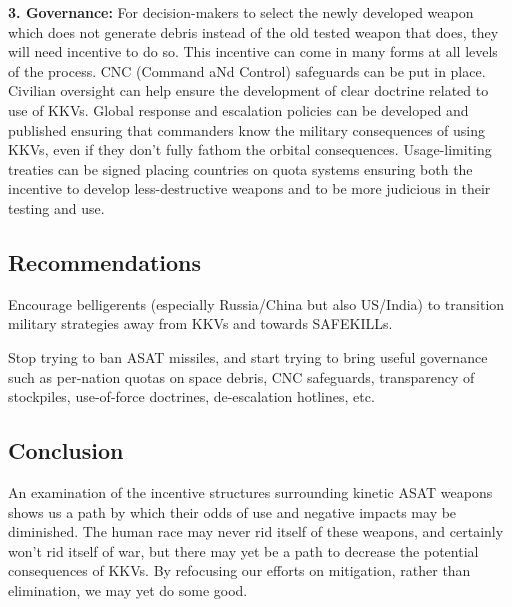 \textbf{3. Governance:} For decision-makers to select the newly
developed weapon which does not generate debris instead of the old
tested weapon that does, they will need incentive to do so.  This
incentive can come in many forms at all levels of the process. CNC
(Command aNd Control) safeguards can be put in place.  Civilian
oversight can help ensure the development of clear doctrine related to
use of KKVs.  Global response and escalation policies can be developed
and published ensuring that commanders know the military consequences
of using KKVs, even if they don't fully fathom the orbital
consequences.  Usage-limiting treaties can be signed placing countries
on quota systems ensuring both the incentive to develop
less-destructive weapons and to be more judicious in their testing and
use.

\subsection*{Recommendations}

Encourage belligerents (especially Russia/China but also US/India) to
transition military strategies away from KKVs and towards SAFEKILLs.

Stop trying to ban ASAT missiles, and start trying to bring useful
governance such as per-nation quotas on space debris, CNC safeguards,
transparency of stockpiles, use-of-force doctrines, de-escalation
hotlines, etc.

\subsection*{Conclusion}

An examination of the incentive structures surrounding kinetic ASAT
weapons shows us a path by which their odds of use and negative
impacts may be diminished.  The human race may never rid itself of
these weapons, and certainly won't rid itself of war, but there may
yet be a path to decrease the potential consequences of KKVs.  By
refocusing our efforts on mitigation, rather than elimination, we may
yet do some good.
